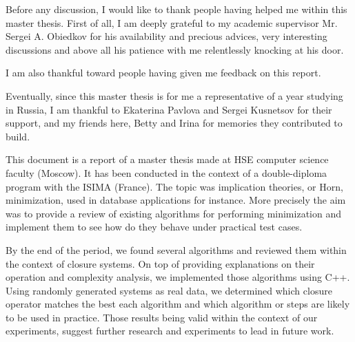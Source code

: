 \documentclass[a4paper, 10pt]{report}
\begin{document}
	

	



Before any discussion, I would like to thank people having helped me within this master thesis. First of all, I am deeply grateful to my academic supervisor Mr. Sergei A. Obiedkov for his availability and precious advices, very interesting discussions and above all his patience with me relentlessly knocking at his door.

I am also thankful toward people having given me feedback on this report.

Eventually, since this master thesis is for me a representative of a year studying in Russia, I am thankful to Ekaterina Pavlova and Sergei Kusnetsov for their support, and my friends here, Betty and Irina for memories they contributed to build.

\newpage
\listoffigures
\newpage

\newpage
\listoftables
\newpage

\newpage
\listofalgorithms
\newpage



This document is a report of a master thesis made at HSE computer science faculty (Moscow). It has been conducted in the context of a double-diploma program with the ISIMA (France). The topic was implication theories, or Horn, minimization, used in database applications for instance. More precisely the aim was to provide a review of existing algorithms for performing minimization and implement them to see how do they behave under practical test cases.

\vspace{1.2em}

By the end of the period, we found several algorithms and reviewed them within the context of closure systems. On top of providing explanations on their operation and complexity analysis, we implemented those algorithms using C++.
Using randomly generated systems as real data, we determined which closure operator matches the best each algorithm and which algorithm or steps are likely to be used in practice. Those results being valid within the context
of our experiments, suggest further research and experiments to lead in future work.

\vspace{1.2em}
\end{document}
